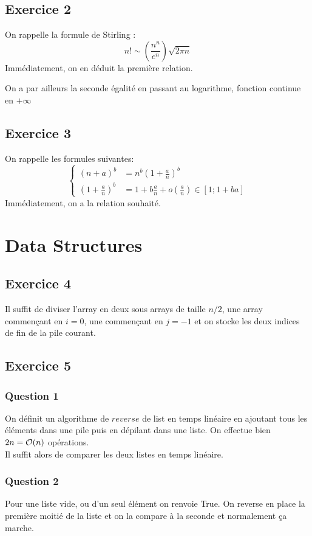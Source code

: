 \documentclass{cours}
\begin{document}
\subsection{Exercice 2}
On rappelle la formule de Stirling : \[n! \sim \left(\frac{n^{n}}{e^{n}}\right)\sqrt{2\pi n}\]
Immédiatement, on en déduit la première relation.

On a par ailleurs la seconde égalité en passant au logarithme, fonction continue en $+\infty$

\subsection{Exercice 3}
On rappelle les formules suivantes: 
\[\begin{cases}    
    (n+a)^{b} &= n^{b}(1 + \frac{a}{n})^{b}\\
    (1+\frac{a}{n})^{b} &= 1 + b\frac{a}{n} + o(\frac{a}{n}) \in \left[1; 1+ba\right]
\end{cases}\]
Immédiatement, on a la relation souhaité.

\section{Data Structures}
\subsection{Exercice 4}
Il suffit de diviser l'array en deux sous arrays de taille $n/2$, une array commençant en $i = 0$, une commençant en $j = -1$ et on stocke les deux indices de fin de la pile courant.

\subsection{Exercice 5}
\subsubsection{Question 1}
On définit un algorithme de $reverse$ de list en temps linéaire en ajoutant tous les éléments dans une pile puis en dépilant dans une liste. On effectue bien $2n = \mathcal{O}(n)$ opérations.\\
Il suffit alors de comparer les deux listes en temps linéaire.

\subsubsection{Question 2}
Pour une liste vide, ou d'un seul élément on renvoie True. 
On reverse en place la première moitié de la liste et on la compare à la seconde et normalement ça marche. 
\end{document}
